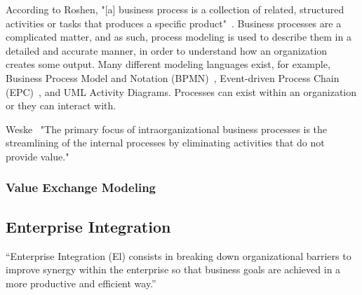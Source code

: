 According to Roshen, "[a] business process is a collection of related, structured activities or tasks that produces a specific product"~\cite{roshen2009soa}. Business processes are a complicated matter, and as such, process modeling is used to describe them in a detailed and accurate manner, in order to understand how an organization creates some output. Many different modeling languages exist, for example, Business Process Model and Notation (BPMN)~\cite{model2011notation}, Event-driven Process Chain (EPC)~\cite[Ch. 6]{scheer2005process}, and UML Activity Diagrams. Processes can exist within an organization or they can interact with. 


Weske~\cite{weske2012business}
"The primary focus of intraorganizational business processes is the streamlining
of the internal processes by eliminating activities that do not provide
value."

\subsubsection{Value Exchange Modeling}



\subsection{Enterprise Integration}

``Enterprise Integration (El) consists in breaking down organizational barriers to improve synergy within the enterprise so that business goals are achieved in a more productive and efficient way.''~\cite{Vernadat200215}
